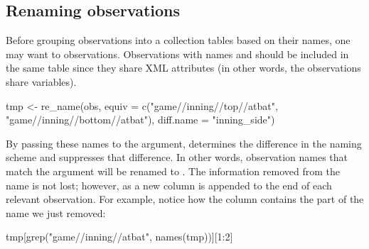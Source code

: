 \begin{article}
\subsection{Renaming observations}

Before grouping observations into a collection tables based on their
names, one may want to  observations. Observations
with names  and 
should be included in the same table since they share XML attributes
(in other words, the observations share variables). 
%
\begin{Schunk}
\begin{Sinput}
tmp <- re_name(obs, equiv = c("game//inning//top//atbat",                             
  "game//inning//bottom//atbat"), diff.name = "inning_side") 
\end{Sinput}
\end{Schunk}
%
By passing these names to the  argument, 
determines the difference in the naming scheme and suppresses that
difference. In other words, observation names that match the 
argument will be renamed to . The information
removed from the name is not lost; however, as a new column is appended
to the end of each relevant observation. For example, notice how the
 column contains the part of the name we just
removed:
%
\begin{Schunk}
\begin{Sinput}
tmp[grep("game//inning//atbat", names(tmp))][1:2]
\end{Sinput}
\end{Schunk}
\end{article}
